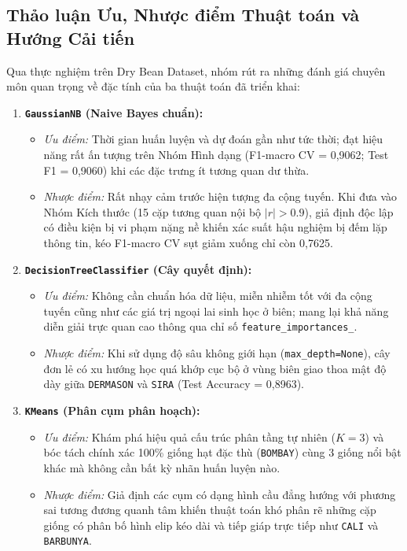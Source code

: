 \documentclass[a4paper,12pt]{report}
\begin{document}
\subsection{Thảo luận Ưu, Nhược điểm Thuật toán và Hướng Cải tiến}
Qua thực nghiệm trên Dry Bean Dataset, nhóm rút ra những đánh giá chuyên môn quan trọng về đặc tính của ba thuật toán đã triển khai:
\begin{enumerate}[leftmargin=*]
    \item \textbf{\texttt{GaussianNB} (Naive Bayes chuẩn):}
    \begin{itemize}
        \item \textit{Ưu điểm:} Thời gian huấn luyện và dự đoán gần như tức thời; đạt hiệu năng rất ấn tượng trên Nhóm Hình dạng (F1-macro CV = 0,9062; Test F1 = 0,9060) khi các đặc trưng ít tương quan dư thừa.
        \item \textit{Nhược điểm:} Rất nhạy cảm trước hiện tượng đa cộng tuyến. Khi đưa vào Nhóm Kích thước (15 cặp tương quan nội bộ $|r| > 0.9$), giả định độc lập có điều kiện bị vi phạm nặng nề khiến xác suất hậu nghiệm bị đếm lặp thông tin, kéo F1-macro CV sụt giảm xuống chỉ còn 0,7625.
    \end{itemize}
    \item \textbf{\texttt{DecisionTreeClassifier} (Cây quyết định):}
    \begin{itemize}
        \item \textit{Ưu điểm:} Không cần chuẩn hóa dữ liệu, miễn nhiễm tốt với đa cộng tuyến cũng như các giá trị ngoại lai sinh học ở biên; mang lại khả năng diễn giải trực quan cao thông qua chỉ số \texttt{feature\_importances\_}.
        \item \textit{Nhược điểm:} Khi sử dụng độ sâu không giới hạn (\texttt{max\_depth=None}), cây đơn lẻ có xu hướng học quá khớp cục bộ ở vùng biên giao thoa mật độ dày giữa \texttt{DERMASON} và \texttt{SIRA} (Test Accuracy = 0,8963).
    \end{itemize}
    \item \textbf{\texttt{KMeans} (Phân cụm phân hoạch):}
    \begin{itemize}
        \item \textit{Ưu điểm:} Khám phá hiệu quả cấu trúc phân tầng tự nhiên ($K = 3$) và bóc tách chính xác 100\% giống hạt đặc thù (\texttt{BOMBAY}) cùng 3 giống nổi bật khác mà không cần bất kỳ nhãn huấn luyện nào.
        \item \textit{Nhược điểm:} Giả định các cụm có dạng hình cầu đẳng hướng với phương sai tương đương quanh tâm khiến thuật toán khó phân rẽ những cặp giống có phân bố hình elip kéo dài và tiếp giáp trực tiếp như \texttt{CALI} và \texttt{BARBUNYA}.
    \end{itemize}
\end{enumerate}
\end{document}
